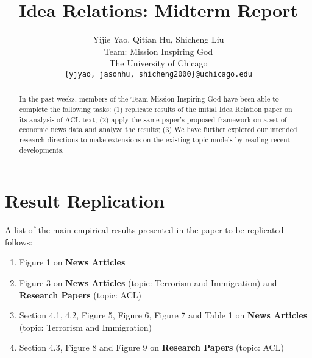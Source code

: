 \documentclass[11pt,a4paper]{article}
\title{Idea Relations: Midterm Report}
\author{Yijie Yao, Qitian Hu, Shicheng Liu \\
Team: Mission Inspiring God \\
The University of Chicago  \\
  \texttt{\{yjyao, jasonhu, shicheng2000\}@uchicago.edu} \\}
\date{}
\begin{document}
\maketitle
\begin{abstract}
In the past weeks, members of the Team Mission Inspiring God have been able to 
complete the following tasks: (1) replicate results of the initial Idea Relation paper
\citet{chenhao-idea-relations} on its analysis of ACL text; (2) apply the same paper's 
proposed framework on a set of economic news data \cite{econ-news-dataset} and 
analyze the results; (3) We have further explored our intended research directions to make extensions on the existing topic models by reading recent developments.
\end{abstract}

\section{Result Replication}

A list of the main empirical results presented in the paper to be replicated
\cite{chenhao-idea-relations} follows:

\begin{enumerate}
  \item Figure 1 on \textbf{News Articles}
  \item Figure 3 on \textbf{News Articles} (topic: Terrorism and Immigration)
   and \textbf{Research Papers} (topic: ACL)
  \item Section 4.1, 4.2, Figure 5, Figure 6, Figure 7 and Table 1 on 
  \textbf{News Articles} (topic: Terrorism and Immigration)
  \item Section 4.3, Figure 8 and Figure 9 on \textbf{Research Papers} 
  (topic: ACL)
\end{enumerate}


\end{document}
